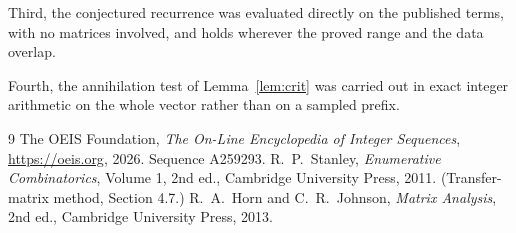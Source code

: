 \documentclass[11pt,a4paper]{article}
\theoremstyle{plain}
\theoremstyle{definition}
\begin{document}
Third, the conjectured recurrence was evaluated directly on the published terms, with no
matrices involved, and holds wherever the proved range and the data overlap.

Fourth, the annihilation test of Lemma~\ref{lem:crit} was carried out in exact integer
arithmetic on the whole vector rather than on a sampled prefix.

\begin{thebibliography}{9}
 The OEIS Foundation, \emph{The On-Line Encyclopedia of Integer
Sequences}, \url{https://oeis.org}, 2026. Sequence A259293.
 R.~P.~Stanley, \emph{Enumerative Combinatorics}, Volume 1, 2nd ed.,
Cambridge University Press, 2011. (Transfer-matrix method, Section 4.7.)
 R.~A.~Horn and C.~R.~Johnson, \emph{Matrix Analysis}, 2nd ed., Cambridge
University Press, 2013.
\end{thebibliography}
\end{document}
